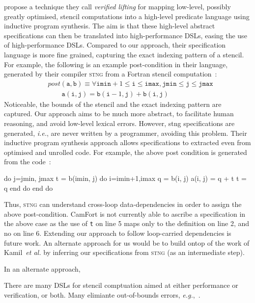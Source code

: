 \documentclass[9pt]{sigplanconf}
\theoremstyle{definition}
\newcommand{\ie}{\emph{i.e.}}
\newcommand{\eg}{\emph{e.g.}}
\begin{document}
\citet{kamil2016verified} propose a technique they call
\emph{verified lifting} for mapping low-level, possibly
greatly optimised, stencil computations into a high-level
predicate language using inductive program synthesis. 
The aim is that these high-level abstract specifications can
then be translated into high-performance DSLs, easing the
use of high-performance DSLs. Compared to our approach,
their specification language is more fine grained, capturing
the exact indexing pattern of a stencil. For example, the following
is an example post-condition in their language, generated by their
compiler \textsc{stng} from a Fortran stencil computation~\cite [p.3]{kamil2016verified}:
%
\begin{align*}
& \textit{post}(\texttt{a}, \texttt{b}) \equiv \forall \texttt{imin}+1 
\leq \texttt{i} \leq \texttt{imax}, \texttt{jmin} \leq \texttt{j} \leq
\texttt{jmax} \\
& \qquad \texttt{a}(\texttt{i},\texttt{j}) = 
\texttt{b}(\texttt{i}-1,\texttt{j}) + \texttt{b}(\texttt{i},\texttt{j})
\end{align*}
%
Noticeable, the bounds of the stencil and the exact indexing pattern
are captured. Our approach aims to be much more abstract, to
facilitate human reasoning, and avoid low-level lexical
errors. However, \textsf{stng} specifications are generated, \ie{}, 
are never written by a programmer, avoiding this
problem. Their inductive program synthesis approach allows
specifications to extracted even from optimised and unrolled code. For
example, the above post condition is generated from the code~\cite [p.3]{kamil2016verified}:
%
\begin{ExmVerbatim}
do j=jmin, jmax 
    t = b(imin, j)
    do i=imin+1,imax
        q = b(i, j)
        a(i, j) = q + t
        t = q
    end do
end do
\end{ExmVerbatim}
%
Thus, \textsc{stng} can understand cross-loop data-dependencies
in order to assign the above post-condition. CamFort is not currently
able to ascribe a specification in the above case as the use of
\texttt{t} on line 5 maps only to the definition on line 2, and no on
line 6. Extending our approach to follow loop-carried dependencies is
future work. An alternate approach for us would be to build ontop of
the work of Kamil~\emph{et al.} by inferring our specifications from 
\textsc{stng} (as an intermediate step). 

In an alternate approach,~\citet{abe2013model} 

There are many DSLs for stencil comptuation aimed at either
performance or verification, or both. Many elimiante out-of-bounds
errors, \eg{},~\cite{DBLP:journals/corr/abs-1109-0777}. 





\onecolumn
\appendix


\end{document}
